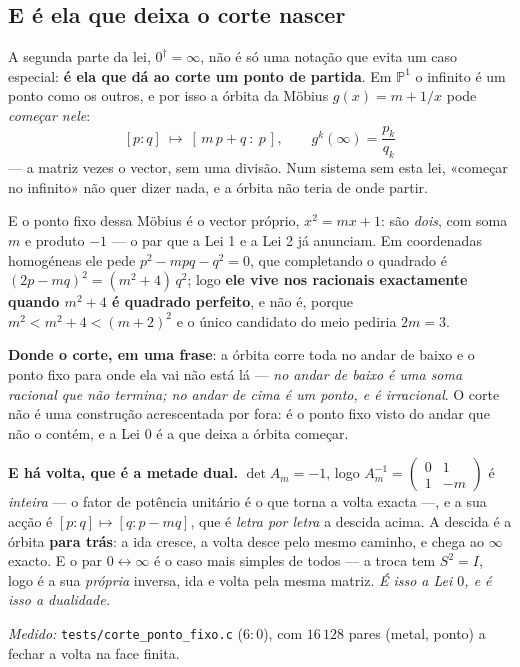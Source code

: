 \documentclass[11pt,a4paper]{article}
\newcommand{\code}[1]{\texttt{\small #1}}
\newcommand{\dg}{^{\dagger}}
\begin{document}
\subsection*{E é ela que deixa o corte nascer}

\noindent A segunda parte da lei, $0\dg=\infty$, não é só uma notação que evita um caso
especial: \textbf{é ela que dá ao corte um ponto de partida}. Em $\mathbb{P}^1$ o infinito
é um ponto como os outros, e por isso a órbita da Möbius $g(x)=m+1/x$ pode \emph{começar
nele}:
\[
[p:q]\ \longmapsto\ [\,m\,p+q\ :\ p\,],
\qquad
g^{k}(\infty)=\frac{p_k}{q_k}
\]
--- a matriz vezes o vector, sem uma divisão. Num sistema sem esta lei, «começar no
infinito» não quer dizer nada, e a órbita não teria de onde partir.

\noindent E o ponto fixo dessa Möbius é o vector próprio, $x^{2}=mx+1$: são \emph{dois},
com soma $m$ e produto $-1$ --- o par que a Lei 1 e a Lei 2 já anunciam. Em coordenadas
homogéneas ele pede $p^{2}-mpq-q^{2}=0$, que completando o quadrado é
$(2p-mq)^{2}=(m^{2}+4)\,q^{2}$; logo \textbf{ele vive nos racionais exactamente quando
$m^{2}+4$ é quadrado perfeito}, e não é, porque $m^{2}<m^{2}+4<(m+2)^{2}$ e o único
candidato do meio pediria $2m=3$.

\noindent \textbf{Donde o corte, em uma frase}: a órbita corre toda no andar de baixo e o
ponto fixo para onde ela vai não está lá --- \emph{no andar de baixo é uma soma racional
que não termina; no andar de cima é um ponto, e é irracional}. O corte não é uma
construção acrescentada por fora: é o ponto fixo visto do andar que não o contém, e a Lei
$0$ é a que deixa a órbita começar.

\noindent \textbf{E há volta, que é a metade dual.} $\det A_m=-1$, logo
$A_m^{-1}=\left(\begin{smallmatrix}0&1\\1&-m\end{smallmatrix}\right)$ é \emph{inteira} ---
o fator de potência unitário é o que torna a volta exacta ---, e a sua acção é
$[p:q]\mapsto[q:p-mq]$, que é \emph{letra por letra} a descida acima. A descida é a órbita
\textbf{para trás}: a ida cresce, a volta desce pelo mesmo caminho, e chega ao $\infty$
exacto. E o par $0\leftrightarrow\infty$ é o caso mais simples de todos --- a troca tem
$S^{2}=I$, logo é a sua \emph{própria} inversa, ida e volta pela mesma matriz. \emph{É isso
a Lei $0$, e é isso a dualidade.}

\emph{Medido:} \code{tests/corte\_ponto\_fixo.c} ($6{:}0$), com $16\,128$ pares
(metal, ponto) a fechar a volta na face finita.
\end{document}
